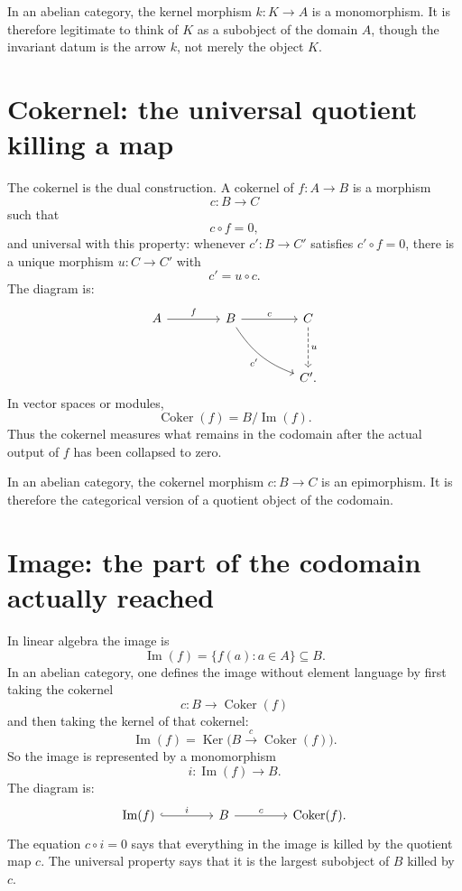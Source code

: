 In an abelian category, the kernel morphism \(k:K\to A\) is a monomorphism.  It is therefore legitimate to think of \(K\) as a subobject of the domain \(A\), though the invariant datum is the arrow \(k\), not merely the object \(K\).

\section{Cokernel: the universal quotient killing a map}

The cokernel is the dual construction.  A cokernel of \(f:A\to B\) is a morphism
\[
  c:B\to C
\]
such that
\[
  c\circ f=0,
\]
and universal with this property: whenever \(c':B\to C'\) satisfies \(c'\circ f=0\), there is a unique morphism \(u:C\to C'\) with
\[
  c'=u\circ c.
\]
The diagram is:
\[
\begin{tikzcd}[column sep=4.2em,row sep=3.2em]
A \arrow[r, "f"] & B \arrow[r, "c"] \arrow[dr, "c'"', bend right=18] & C \arrow[d, dashed, "u"] \\
& & C' .
\end{tikzcd}
\]
In vector spaces or modules,
\[
  \operatorname{Coker}(f)=B/\operatorname{Im}(f).
\]
Thus the cokernel measures what remains in the codomain after the actual output of \(f\) has been collapsed to zero.

In an abelian category, the cokernel morphism \(c:B\to C\) is an epimorphism.  It is therefore the categorical version of a quotient object of the codomain.

\section{Image: the part of the codomain actually reached}

In linear algebra the image is
\[
  \operatorname{Im}(f)=\{f(a):a\in A\}\subseteq B.
\]
In an abelian category, one defines the image without element language by first taking the cokernel
\[
  c:B\to \operatorname{Coker}(f)
\]
and then taking the kernel of that cokernel:
\[
  \operatorname{Im}(f)=\operatorname{Ker}\bigl(B\xrightarrow{c}\operatorname{Coker}(f)\bigr).
\]
So the image is represented by a monomorphism
\[
  i:\operatorname{Im}(f)\to B.
\]
The diagram is:
\[
\begin{tikzcd}[column sep=4.2em]
\operatorname{Im}(f) \arrow[r, "i", hook] & B \arrow[r, "c"] & \operatorname{Coker}(f).
\end{tikzcd}
\]
The equation \(c\circ i=0\) says that everything in the image is killed by the quotient map \(c\).  The universal property says that it is the largest subobject of \(B\) killed by \(c\).

